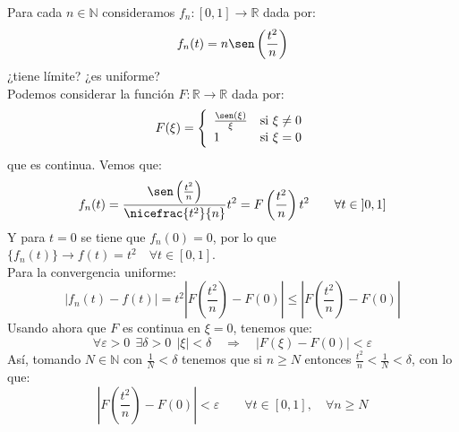 \documentclass[12pt]{article}
\begin{document}
    \begin{ejercicio}
        Para cada $n\in \mathbb{N}$ consideramos $f_n:[0,1]\to\mathbb{R}$ dada por:
        \begin{equation*}
            f_n(t) = n\sen\left(\frac{t^2}{n}\right)
        \end{equation*}
        ¿tiene límite? ¿es uniforme?\\

        \noindent
        Podemos considerar la función $F:\mathbb{R}\to\mathbb{R}$ dada por:
        \begin{equation*}
            F(\xi) = \left\{\begin{array}{ll}
                \frac{\sen(\xi)}{\xi} & \text{si\ } \xi\neq0  \\
                 1 & \text{si\ } \xi = 0
            \end{array}\right. 
        \end{equation*}
        que es continua. Vemos que:
        \begin{equation*}
            f_n(t) = \frac{\sen\left(\frac{t^2}{n}\right)}{\nicefrac{t^2}{n}}t^2 = F\left(\frac{t^2}{n}\right)t^2 \qquad \forall t\in \left]0,1\right]
        \end{equation*}
        Y para $t=0$ se tiene que $f_n(0) = 0$, por lo que $\{f_n(t)\}\to f(t) = t^2\quad \forall t\in [0,1]$.\\

        \noindent
        Para la convergencia uniforme:
        \begin{equation*}
            |f_n(t) - f(t)| = t^2\left|F\left(\frac{t^2}{n}\right)-F(0)\right| \leq \left|F\left(\frac{t^2}{n}\right)-F(0)\right|
        \end{equation*}
        Usando ahora que $F$ es continua en $\xi=0$, tenemos que:
        \begin{equation*}
            \forall \varepsilon>0~~\exists \delta > 0 ~~ |\xi|<\delta \quad\Longrightarrow\quad |F(\xi)-F(0)| < \varepsilon
        \end{equation*}
        Así, tomando $N\in \mathbb{N}$ con $\frac{1}{N}<\delta$ tenemos que si $n\geq N$ entonces $\frac{t^2}{n}<\frac{1}{N}<\delta$, con lo que:
        \begin{equation*}
            \left|F\left(\frac{t^2}{n}\right)-F(0)\right| < \varepsilon \qquad \forall t\in [0,1],\quad \forall n\geq N
        \end{equation*}
    \end{ejercicio}
\end{document}
